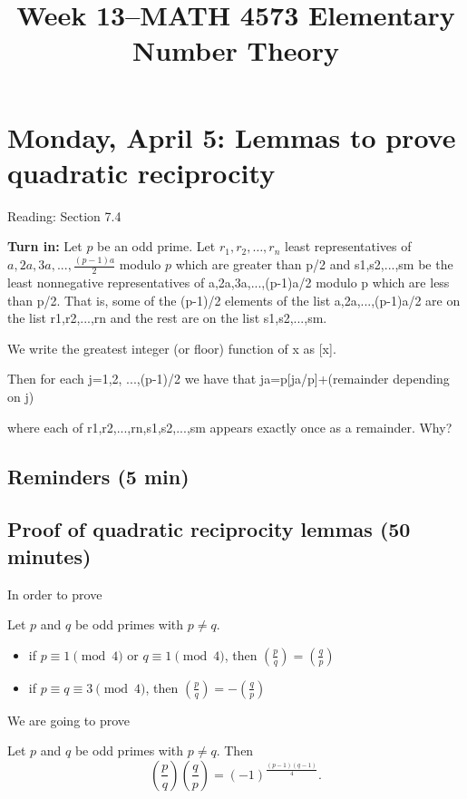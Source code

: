 \documentclass[letterpaper, 11 pt]{article}
\title{Week 13--MATH 4573 Elementary Number Theory}
\begin{document}
\maketitle
\tableofcontents
\section{Monday, April 5: Lemmas to prove quadratic reciprocity}
Reading: Section 7.4

{\bf Turn in: }
Let $p$ be an odd prime. Let $ r_1,r_2,\dots,r_n$ least representatives of $a,2a,3a,...,\frac{(p-1)a}{2}$ modulo $p$ which are greater than p/2 and s1,s2,...,sm be the least nonnegative representatives of a,2a,3a,...,(p-1)a/2 modulo p which are less than p/2. That is, some of the (p-1)/2 elements of the list a,2a,...,(p-1)a/2 are on the list r1,r2,...,rn  and the rest are on the list s1,s2,...,sm.

We write the greatest integer (or floor) function of x as [x].

Then for each j=1,2, ...,(p-1)/2 we have that ja=p[ja/p]+(remainder depending on j)

where each of r1,r2,...,rn,s1,s2,...,sm appears exactly once as a remainder. Why?
\subsection{Reminders (5 min)}

\subsection{Proof of quadratic reciprocity lemmas (50 minutes)}

In order to prove 
\begin{thm}
 Let $p$ and $q$ be odd primes with $p\neq q$. 
\begin{itemize}
 \item if $p\equiv 1 \pmod 4$ or $q\equiv 1 \pmod 4$, then $\left(\frac{p}{q}\right)=\left(\frac{q}{p}\right)$
 \item if $p\equiv q\equiv 3 \pmod 4$, then $\left(\frac{p}{q}\right)=-\left(\frac{q}{p}\right)$
\end{itemize}
\end{thm}

We are going to prove 
\begin{thm}
 Let $p$ and $q$ be odd primes with $p\neq q$. Then \[\left(\frac{p}{q}\right)\left(\frac{q}{p}\right)=(-1)^{\frac{(p-1)(q-1)}{4}}.\]
\end{thm}
\end{document}
